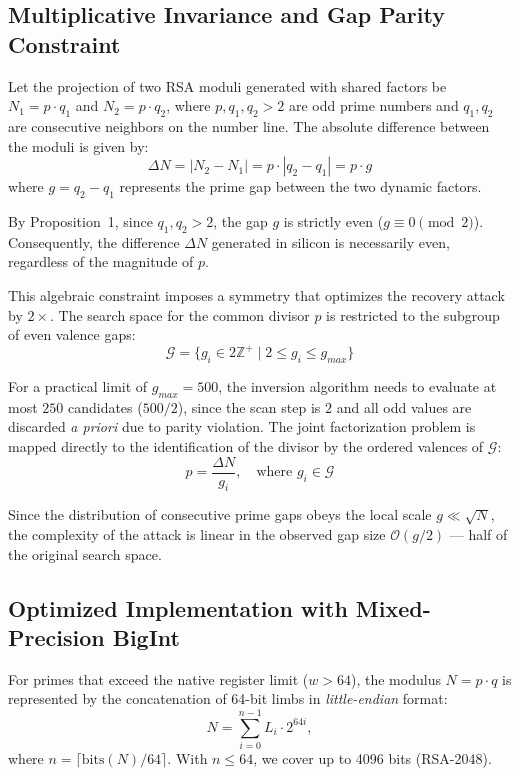 \documentclass[12pt,a4paper]{article}
\theoremstyle{plain}
\begin{document}
\subsection{Multiplicative Invariance and Gap Parity Constraint}

Let the projection of two RSA moduli generated with shared factors be
$N_1 = p \cdot q_1$ and $N_2 = p \cdot q_2$, where $p, q_1, q_2 > 2$
are odd prime numbers and $q_1, q_2$ are consecutive neighbors on the
number line. The absolute difference between the moduli is given by:
\[
\Delta N = |N_2 - N_1| = p \cdot |q_2 - q_1| = p \cdot g
\]
where $g = q_2 - q_1$ represents the prime gap between the two dynamic
factors.

By Proposition~1, since $q_1, q_2 > 2$, the gap $g$ is strictly even
($g \equiv 0 \pmod 2$). Consequently, the difference $\Delta N$
generated in silicon is necessarily even, regardless of the magnitude of
$p$.

This algebraic constraint imposes a symmetry that optimizes the
recovery attack by $2\times$. The search space for the common divisor
$p$ is restricted to the subgroup of even valence gaps:
\[
\mathcal{G} = \{ g_i \in 2\mathbb{Z}^+ \mid 2 \le g_i \le g_{max} \}
\]

For a practical limit of $g_{max} = 500$, the inversion algorithm
needs to evaluate at most $250$ candidates ($500/2$), since the scan
step is $2$ and all odd values are discarded \textit{a priori} due to
parity violation. The joint factorization problem is mapped directly to
the identification of the divisor by the ordered valences of $\mathcal{G}$:
\[
p = \frac{\Delta N}{g_i}, \quad \text{where } g_i \in \mathcal{G}
\]

Since the distribution of consecutive prime gaps obeys the local scale
$g \ll \sqrt{N}$, the complexity of the attack is linear in the
observed gap size $\mathcal{O}(g/2)$ — half of the original search space.

\subsection{Optimized Implementation with Mixed-Precision BigInt}

For primes that exceed the native register limit ($w > 64$), the
modulus $N = p \cdot q$ is represented by the concatenation of 64-bit
limbs in \textit{little-endian} format:
\[
N = \sum_{i=0}^{n-1} L_i \cdot 2^{64i},
\]
where $n = \lceil \text{bits}(N) / 64 \rceil$. With $n \leq 64$, we
cover up to 4096 bits (RSA-2048).
\end{document}
